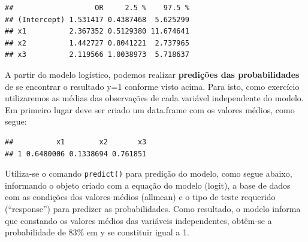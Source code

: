 \documentclass[12pt,brazil,]{book}
\newenvironment{Shaded}{\begin{snugshade}}{\end{snugshade}}
\newcommand{\DataTypeTok}[1]{\textcolor[rgb]{0.13,0.29,0.53}{#1}}
\newcommand{\KeywordTok}[1]{\textcolor[rgb]{0.13,0.29,0.53}{\textbf{#1}}}
\newcommand{\NormalTok}[1]{#1}
\newcommand{\OperatorTok}[1]{\textcolor[rgb]{0.81,0.36,0.00}{\textbf{#1}}}
\newcommand{\StringTok}[1]{\textcolor[rgb]{0.31,0.60,0.02}{#1}}
\begin{document}
\begin{verbatim}
##                   OR     2.5 %    97.5 %
## (Intercept) 1.531417 0.4387468  5.625299
## x1          2.367352 0.5129380 11.674641
## x2          1.442727 0.8041221  2.737965
## x3          2.119566 1.0038973  5.718637
\end{verbatim}

A partir do modelo logístico, podemos realizar \textbf{predições das
probabilidades} de se encontrar o resultado y=1 conforme visto acima.
Para isto, como exercício utilizaremos as médias das observações de cada
variável independente do modelo. Em primeiro lugar deve ser criado um
data.frame com os valores médios, como segue:

\begin{Shaded}
\end{Shaded}

\begin{verbatim}
##          x1        x2       x3
## 1 0.6480006 0.1338694 0.761851
\end{verbatim}

Utiliza-se o comando \texttt{predict()} para predição do modelo, como
segue abaixo, informando o objeto criado com a equação do modelo
(logit), a base de dados com as condições dos valores médios (allmean) e
o tipo de teste requerido (``response'') para predizer as
probabilidades. Como resultado, o modelo informa que constando os
valores médios das variáveis independentes, obtêm-se a probabilidade de
83\% em y se constituir igual a 1.

\begin{Shaded}
\end{Shaded}
\end{document}
